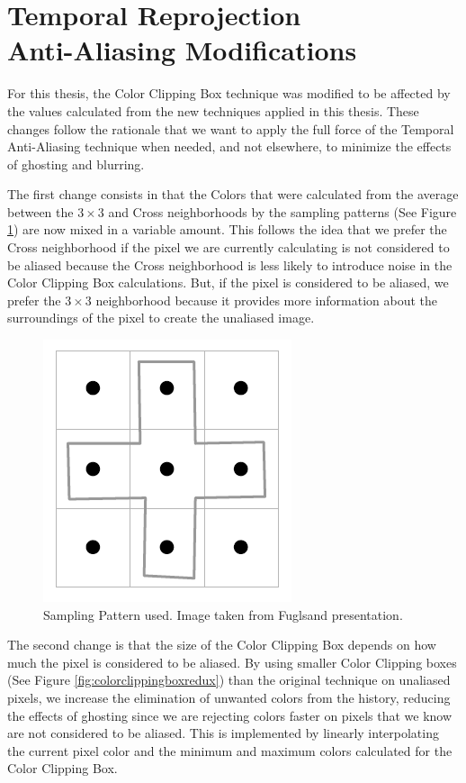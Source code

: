 \documentclass{cslthse-msc}
\begin{document}
\section[Temporal Reprojection Anti-Aliasing Modifications]{Temporal Reprojection \\ Anti-Aliasing Modifications}
For this thesis, the Color Clipping Box technique was modified to be affected by the values calculated from the new techniques applied in this thesis. These changes follow the rationale that we want to apply the full force of the Temporal Anti-Aliasing technique when needed, and not elsewhere, to minimize the effects of ghosting and blurring.

The first change consists in that the Colors that were calculated from the average between the $3\times 3$ and Cross neighborhoods by the sampling patterns (See Figure \ref{fig:samplingpattern_2}) are now mixed in a variable amount. This follows the idea that we prefer the Cross neighborhood if the pixel we are currently calculating is not considered to be aliased because the Cross neighborhood is less likely to introduce noise in the Color Clipping Box calculations. But, if the pixel is considered to be aliased, we prefer the $3\times 3$ neighborhood because it provides more information about the surroundings of the pixel to create the unaliased image.  

\begin{figure}[!hbt]
	\centering
	\includegraphics[scale=0.3]{images/sampling_pattern.png}
	\caption{Sampling Pattern used. Image taken from Fuglsand presentation. \protect\cite{Fuglsand2016}}\label{fig:samplingpattern_2}
\end{figure}

The second change is that the size of the Color Clipping Box depends on how much the pixel is considered to be aliased. By using smaller Color Clipping boxes (See Figure \ref{fig:colorclippingboxredux}) than the original technique on unaliased pixels, we increase the elimination of unwanted colors from the history, reducing the effects of ghosting since we are rejecting colors faster on pixels that we know are not considered to be aliased. This is implemented by linearly interpolating the current pixel color and the minimum and maximum colors calculated for the Color Clipping Box.
\end{document}
